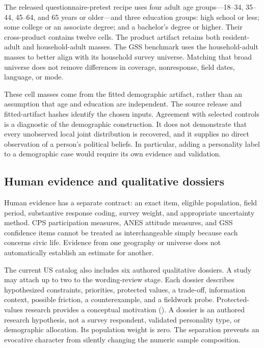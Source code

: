 \documentclass[
  11pt,
]{article}
\begin{document}
The released questionnaire-pretest recipe uses four adult age
groups---18--34, 35--44, 45--64, and 65 years or older---and three
education groups: high school or less; some college or an associate
degree; and a bachelor's degree or higher. Their cross-product contains
twelve cells. The product artifact retains both resident-adult and
household-adult masses. The GSS benchmark uses the household-adult
masses to better align with its household survey universe. Matching that
broad universe does not remove differences in coverage, nonresponse,
field dates, language, or mode.

These cell masses come from the fitted demographic artifact, rather than
an assumption that age and education are independent. The source release
and fitted-artifact hashes identify the chosen inputs. Agreement with
selected controls is a diagnostic of the demographic construction. It
does not demonstrate that every unobserved local joint distribution is
recovered, and it supplies no direct observation of a person's political
beliefs. In particular, adding a personality label to a demographic case
would require its own evidence and validation.

\subsection{Human evidence and qualitative
dossiers}\label{human-evidence-and-qualitative-dossiers}

Human evidence has a separate contract: an exact item, eligible
population, field period, substantive response coding, survey weight,
and appropriate uncertainty method. CPS participation measures, ANES
attitude measures, and GSS confidence items cannot be treated as
interchangeable simply because each concerns civic life. Evidence from
one geography or universe does not automatically establish an estimate
for another.

The current US catalog also includes six authored qualitative dossiers.
A study may attach up to two to the wording-review stage. Each dossier
describes hypothesized constraints, priorities, protected values, a
trade-off, information context, possible friction, a counterexample, and
a fieldwork probe. Protected-values research provides a conceptual
motivation (). A dossier
is an authored research hypothesis, not a survey respondent, validated
personality type, or demographic allocation. Its population weight is
zero. The separation prevents an evocative character from silently
changing the numeric sample composition.
\end{document}
